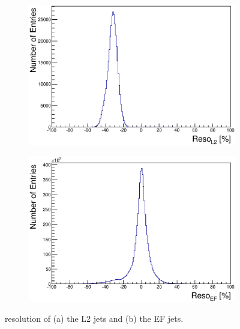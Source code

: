 \begin{figure}
\centering
        \begin{subfigure}[b]{0.5\textwidth}
                \centering
                \includegraphics[width=\textwidth]{figures/ServiceWork/Jets/L2_ResoMatchedJetsJet.eps}
        \end{subfigure}%
        \begin{subfigure}[b]{0.5\textwidth}
                \centering
                \includegraphics[width=\textwidth]{figures/ServiceWork/Jets/EF_ResoMatchedJetsJet.eps}
        \end{subfigure}%
\caption[\et{} resolution between offline jet \et{} and L2/EF jet \et{}]{
\et{} resolution of (a) the L2 jets and (b) the EF jets. 
\label{SW_jet_L2EF_Reco}}
\end{figure}

